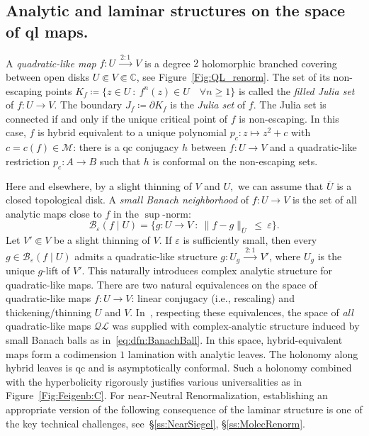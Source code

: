 \documentclass[twoside,leqno]{article}
\theoremstyle{plain}
\newcommand{\C}{{\mathbb{C}}}
\newcommand\MM{{\mathcal{M}}}
\newcommand\Jul{J}
\newcommand\filled{K}
\newcommand{\QL}{{\mathcal Q\mathcal L}}
\begin{document}
\subsection{Analytic and laminar structures on the space of ql maps.}\label{ss:RR:QL:analyt} A \emph{quadratic-like map} $f\colon U \ \overset{2:1}\longrightarrow\ V$ is a degree $2$ holomorphic branched covering between open disks $U\Subset V\Subset \C$, see Figure~\ref{Fig:QL_renorm}. The set of its non-escaping points $ \filled_f\coloneqq \{z\in U\ : \ f^n(z)\in U \quad \forall n\ge1\}$
is called the \emph{filled Julia set} of $f\colon U\to V$. The boundary $\Jul_f\coloneqq \partial \filled_f$ is the \emph{Julia set} of $f$. The Julia set is connected if and only if the unique critical point of $f$ is non-escaping. In this case, $f$ is hybrid equivalent to a unique polynomial $p_c\colon z\mapsto z^2+c$ with $c=c(f)\in \MM$: there is a qc conjugacy $h$ between $f\colon U\to V$ and a quadratic-like restriction $p_c\colon A\to B$ such that $h$ is conformal on the non-escaping sets.



Here and elsewhere, by a slight thinning of $V$ and $U,$ we can assume that $\overline U$ is a closed topological disk. A \emph{small Banach neighborhood} of $f\colon U\to V$ is the set of all analytic maps close to $f$ in the $\sup$-norm:
\begin{equation}
\label{eq:dfn:BanachBall}
\mathcal B_\varepsilon (f\mid U) = \{g\colon U\to V \ :\ \|f-g\|_{\overline U}\ \le\  \varepsilon\}.    
\end{equation}
Let $V'\Subset V$ be a slight thinning of $V$. If $\varepsilon$ is sufficiently small, then every $g\in \mathcal B_\varepsilon (f\mid U)$ admits a quadratic-like structure $g\colon U_g\ \overset{2:1}\longrightarrow\ V'$, where $U_g$ is the unique $g$-lift of $V'$. This naturally introduces complex analytic structure for quadratic-like maps. There are two natural equivalences on the space of quadratic-like maps $f\colon U\to V$: linear conjugacy (i.e., rescaling) and thickening/thinning $U$ and $V$. In~\cite{LyuFeigen}, respecting these equivalences, the space of \emph{all} quadratic-like maps $\QL$ was supplied with complex-analytic structure induced by small Banach balls as in~\eqref{eq:dfn:BanachBall}. In this space, hybrid-equivalent maps form a codimension $1$ lamination with analytic leaves. The holonomy along hybrid leaves is qc and is asymptotically conformal. Such a holonomy combined with the hyperbolicity rigorously justifies various universalities as in Figure~\ref{Fig:Feigenb:C}. For near-Neutral Renormalization, establishing an appropriate version of the following consequence of the laminar structure is one of the key technical challenges, see~\S\ref{ss:NearSiegel}, \S\ref{ss:MolecRenorm}.
\end{document}
